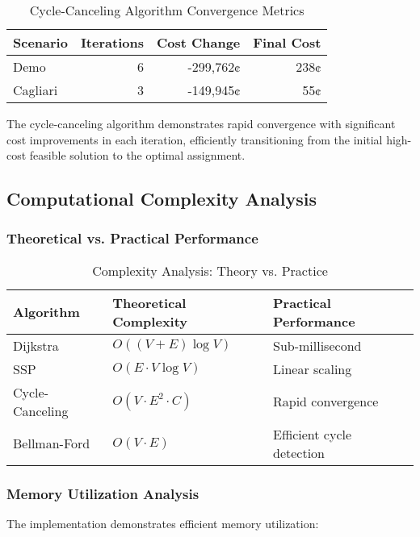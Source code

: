 \documentclass[12pt,a4paper]{article}
\begin{document}
\begin{table}[H]
\centering
\caption{Cycle-Canceling Algorithm Convergence Metrics}
\label{tab:cycle_convergence}
\begin{tabular}{@{}lrrr@{}}
\toprule
\textbf{Scenario} & \textbf{Iterations} & \textbf{Cost Change} & \textbf{Final Cost} \\
\midrule
Demo & 6 & -299,762¢ & 238¢ \\
Cagliari & 3 & -149,945¢ & 55¢ \\
\bottomrule
\end{tabular}
\end{table}

The cycle-canceling algorithm demonstrates rapid convergence with significant cost improvements in each iteration, efficiently transitioning from the initial high-cost feasible solution to the optimal assignment.

\subsection{Computational Complexity Analysis}

\subsubsection{Theoretical vs. Practical Performance}

\begin{table}[H]
\centering
\caption{Complexity Analysis: Theory vs. Practice}
\label{tab:complexity_analysis}
\begin{tabular}{@{}lll@{}}
\toprule
\textbf{Algorithm} & \textbf{Theoretical Complexity} & \textbf{Practical Performance} \\
\midrule
Dijkstra & $O((V + E) \log V)$ & Sub-millisecond \\
SSP & $O(E \cdot V \log V)$ & Linear scaling \\
Cycle-Canceling & $O(V \cdot E^2 \cdot C)$ & Rapid convergence \\
Bellman-Ford & $O(V \cdot E)$ & Efficient cycle detection \\
\bottomrule
\end{tabular}
\end{table}

\subsubsection{Memory Utilization Analysis}

The implementation demonstrates efficient memory utilization:
\end{document}

